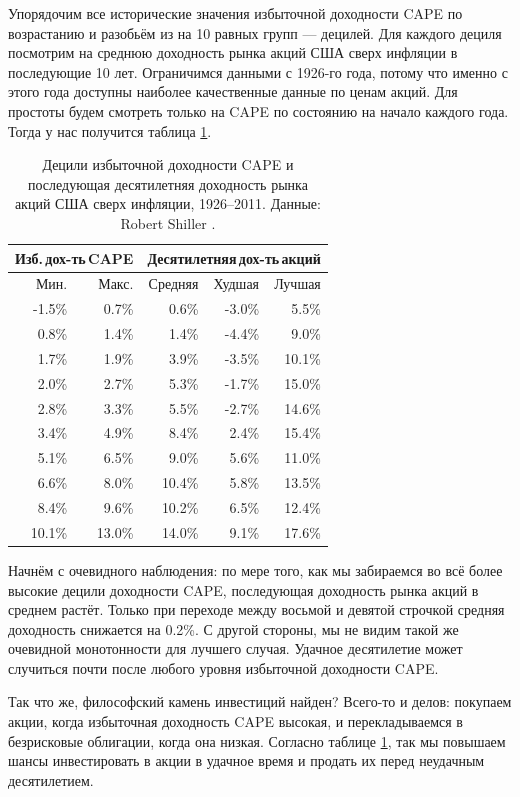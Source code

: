 Упорядочим все исторические значения избыточной доходности CAPE по возрастанию и разобьём из на 10 равных групп --- децилей. Для каждого дециля посмотрим на среднюю доходность рынка акций США сверх инфляции в последующие 10 лет. Ограничимся данными с 1926-го года, потому что именно с этого года доступны наиболее качественные данные по ценам акций. Для простоты будем смотреть только на CAPE по состоянию на начало каждого года. Тогда у нас получится таблица \ref{cape_excess_yield_and_stock_returns_table}.

\begin{table}[ht]
\centering
\begin{tabular}{r|r|r|r|r}
\multicolumn{2}{c|}{Изб.\,дох-ть\,CAPE} &
\multicolumn{3}{c}{Десятилетняя\,дох-ть\,акций} \\
\hline
Мин. & Макс. & Средняя & Худшая & Лучшая \\
\hline
-1.5\% &  0.7\% &  0.6\% & -3.0\% &  5.5\% \\
 0.8\% &  1.4\% &  1.4\% & -4.4\% &  9.0\% \\
 1.7\% &  1.9\% &  3.9\% & -3.5\% & 10.1\% \\
 2.0\% &  2.7\% &  5.3\% & -1.7\% & 15.0\% \\
\hline
 2.8\% &  3.3\% &  5.5\% & -2.7\% & 14.6\% \\
\hline
 3.4\% &  4.9\% &  8.4\% &  2.4\% & 15.4\% \\
 5.1\% &  6.5\% &  9.0\% &  5.6\% & 11.0\% \\
 6.6\% &  8.0\% & 10.4\% &  5.8\% & 13.5\% \\
 8.4\% &  9.6\% & 10.2\% &  6.5\% & 12.4\% \\
10.1\% & 13.0\% & 14.0\% &  9.1\% & 17.6\%        
\end{tabular}
\caption{Децили избыточной доходности CAPE и последующая десятилетняя доходность рынка акций США сверх инфляции, 1926--2011. Данные: Robert Shiller \cite{shillerOnline}.}
\label{cape_excess_yield_and_stock_returns_table}
\end{table}

Начнём с очевидного наблюдения: по мере того, как мы забираемся во всё более высокие децили доходности CAPE, последующая доходность рынка акций в среднем растёт. Только при переходе между восьмой и девятой строчкой средняя доходность снижается на 0.2\%. С другой стороны, мы не видим такой же очевидной монотонности для лучшего случая. Удачное десятилетие может случиться почти после любого уровня избыточной доходности CAPE.

Так что же, философский камень инвестиций найден? Всего-то и делов: покупаем акции, когда избыточная доходность CAPE высокая, и перекладываемся в безрисковые облигации, когда она низкая. Согласно таблице \ref{cape_excess_yield_and_stock_returns_table}, так мы повышаем шансы инвестировать в акции в удачное время и продать их перед неудачным десятилетием.


